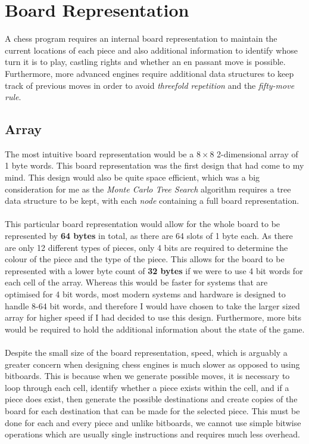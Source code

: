 \chapter{Board Representation}
A chess program requires an internal board representation to maintain the current locations of each piece and also additional information to identify whose turn it is to play, castling rights and whether an en passant move is possible. Furthermore, more advanced engines require additional data structures to keep track of previous moves in order to avoid \textit{threefold repetition} and the \textit{fifty-move rule}.
\section{Array}
The most intuitive board representation would be a $8 \times 8$ 2-dimensional array of 1 byte words. This board representation was the first design that had come to my mind. This design would also be quite space efficient, which was a big consideration for me as the \textit{Monte Carlo Tree Search} algorithm requires a tree data structure to be kept, with each \textit{node} containing a full board representation.\\\\
This particular board representation would allow for the whole board to be represented by \textbf{64 bytes} in total, as there are 64 slots of 1 byte each. As there are only 12 different types of pieces, only 4 bits are required to determine the colour of the piece and the type of the piece. This allows for the board to be represented with a lower byte count of \textbf{32 bytes} if we were to use 4 bit words for each cell of the array. Whereas this would be faster for systems that are optimised for 4 bit words, most modern systems and hardware is designed to handle 8-64 bit words, and therefore I would have chosen to take the larger sized array for higher speed if I had decided to use this design. Furthermore, more bits would be required to hold the additional information about the state of the game.\\\\
Despite the small size of the board representation, speed, which is arguably a greater concern when designing chess engines is much slower as opposed to using bitboards. This is because when we generate possible moves, it is necessary to loop through each cell, identify whether a piece exists within the cell, and if a piece does exist, then generate the possible destinations and create copies of the board for each destination that can be made for the selected piece. This must be done for each and every piece and unlike bitboards, we cannot use simple bitwise operations which are usually single instructions and requires much less overhead.

